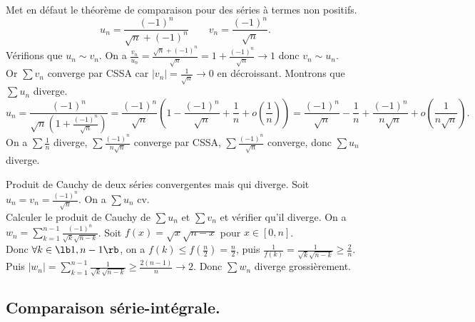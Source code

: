 \documentclass[11pt]{article}
\begin{document}
\begin{ex}{Met en défaut le théorème de comparaison pour des séries à termes non positifs.}{}
    \begin{equation*}
        u_n = \frac{(-1)^n}{\sqrt{n}+(-1)^n} \qquad v_n = \frac{(-1)^n}{\sqrt{n}}.
    \end{equation*}
    \tcblower
    Vérifions que $u_n \sim v_n$. On a $\frac{v_n}{u_n}=\frac{\sqrt{n} + (-1)^n}{\sqrt{n}}=1+\frac{(-1)^n}{\sqrt{n}}\to 1$ donc $v_n \sim u_n$.\\
    Or $\sum v_n$ converge par CSSA car $|v_n|=\frac{1}{\sqrt{n}}\to0$ en décroissant. Montrons que $\sum u_n$ diverge.
    \begin{equation*}
        u_n = \frac{(-1)^n}{\sqrt{n}\left( 1 + \frac{(-1)^n}{\sqrt{n}} \right)} = \frac{(-1)^n}{\sqrt{n}}\left( 1-\frac{(-1)^n}{\sqrt{n}} + \frac{1}{n} + o(\frac{1}{n})\right) = \frac{(-1)^n}{\sqrt{n}} - \frac{1}{n} + \frac{(-1)^n}{n\sqrt{n}} + o(\frac{1}{n\sqrt{n}}).
    \end{equation*}
    On a $\sum \frac{1}{n}$ diverge, $\sum \frac{(-1)^n}{n\sqrt{n}}$ converge par CSSA, $\sum\frac{(-1)^n}{\sqrt{n}}$ converge, donc $\sum u_n$ diverge.
\end{ex}

\vspace*{-0.7cm}

\begin{ex}{Produit de Cauchy de deux séries convergentes mais qui diverge.}{}
    Soit $u_n=v_n=\frac{(-1)^n}{\sqrt{n}}$. On a $\sum u_n$ cv.\\
    Calculer le produit de Cauchy de $\sum u_n$ et $\sum v_n$ et vérifier qu'il diverge.
    \tcblower
    On a $w_n = \sum_{k=1}^{n-1} \frac{(-1)^n}{\sqrt{k}\sqrt{n-k}}$. Soit $f(x)=\sqrt{x}\sqrt{n-x}$ pour $x\in[0,n]$.\\
    Donc $\forall k \in \lb1,n-1\rb$, on a $f(k)\leq f(\frac{n}{2})=\frac{n}{2}$, puis $\frac{1}{f(k)}=\frac{1}{\sqrt{k}\sqrt{n-k}}\geq\frac{2}{n}$.\\
    Puis $|w_n|=\sum_{k=1}^{n-1}\frac{1}{\sqrt{k}\sqrt{n-k}}\geq\frac{2(n-1)}{n}\to2$. Donc $\sum w_n$ diverge grossièrement.
\end{ex}

\vspace*{-0.7cm}

\subsection{Comparaison série-intégrale.}
\end{document}
